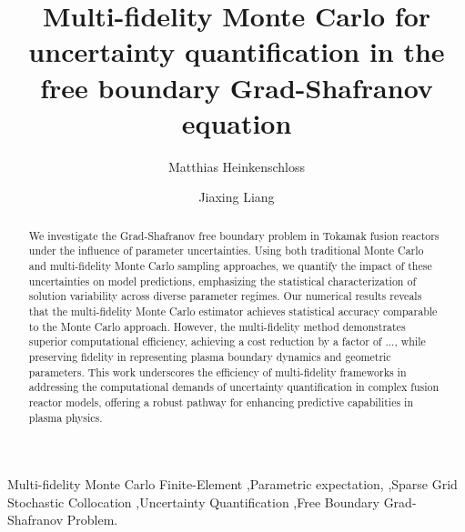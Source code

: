 \documentclass[final,3p,times,11pt]{elsarticle}
\begin{document}
\begin{frontmatter}
\title{Multi-fidelity Monte Carlo for uncertainty quantification in the free boundary Grad-Shafranov equation}


\author[umdcs]{Matthias Heinkenschloss}
\address[umdcs]{Department of Computational Applied Mathematics \& Operations Research, Rice University.}
\author[umdm]{Jiaxing Liang}
\address[umdm]{Department of Computational Applied Mathematics \& Operations Research, Rice University.}
\begin{abstract}
We investigate the Grad-Shafranov free boundary problem in Tokamak fusion reactors under the influence of parameter uncertainties. Using both traditional Monte Carlo and multi-fidelity Monte Carlo sampling approaches, we quantify the impact of these uncertainties on model predictions, emphasizing the statistical characterization of solution variability across diverse parameter regimes. Our numerical results reveals that the multi-fidelity Monte Carlo estimator achieves statistical accuracy comparable to the Monte Carlo approach. However, the multi-fidelity method demonstrates superior computational efficiency, achieving a cost reduction by a factor of ..., while preserving fidelity in representing plasma boundary dynamics and geometric parameters. This work underscores the efficiency of multi-fidelity frameworks in addressing the computational demands of uncertainty quantification in complex fusion reactor models, offering a robust pathway for enhancing predictive capabilities in plasma physics. 
\end{abstract}

\begin{keyword}
Multi-fidelity Monte Carlo Finite-Element \sep Parametric expectation, \sep Sparse Grid Stochastic Collocation \sep Uncertainty Quantification \sep Free Boundary Grad-Shafranov Problem.
%
\MSC[2020] 
\end{keyword}
\end{frontmatter}

\end{document}
